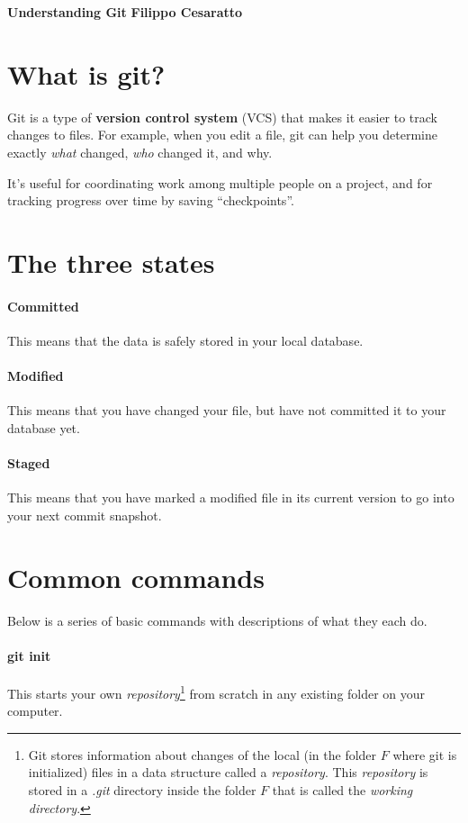 \documentclass[a4paper, 11pt]{article}
\begin{document}
\noindent
\large\textbf{Understanding Git} \hfill \textbf{Filippo Cesaratto} \\
\normalsize

\section*{What is git?}
Git is a type of \textbf{version control system} (VCS) that makes it easier to track changes to files. For example, when you edit a file, git can help you determine exactly \emph{what} changed, \emph{who} changed it, and why.

It's useful for coordinating work among multiple people on a project, and for tracking progress over time by saving ``checkpoints''. 

\section*{The three states}
\paragraph{Committed} This means that the data is safely stored in your local database.
\paragraph{Modified} This means that you have changed your file, but have not committed it to your database yet.
\paragraph{Staged} This means that you have marked a modified file in its current version to go into your next commit snapshot.

\section*{Common commands}
Below is a series of basic commands with descriptions of what they each do.

\paragraph{git init}
This starts your own \emph{repository}\footnote{Git stores information about changes of the local (in the folder $F$ where git is initialized) files in a data structure called a \emph{repository}. This \emph{repository} is stored in a \emph{.git} directory inside the folder $F$ that is called the \emph{working directory}.} from scratch in any existing folder on your computer.
\end{document}

